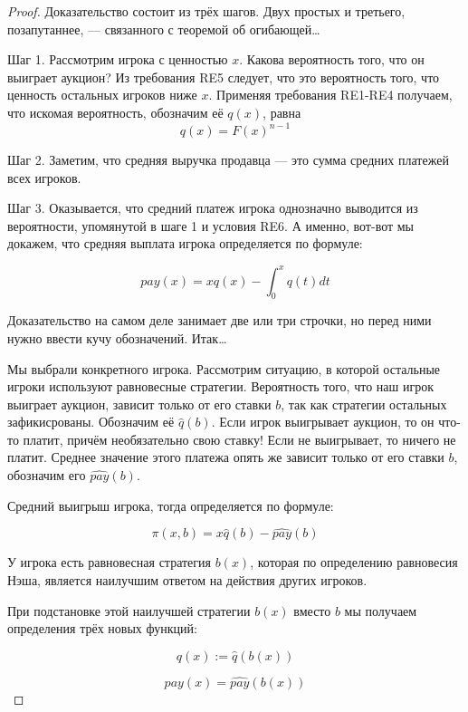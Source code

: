 \begin{proof}

Доказательство состоит из трёх шагов. Двух простых и третьего, позапутаннее, — связанного с теоремой об огибающей\ldots

Шаг 1. Рассмотрим игрока с ценностью $ x $. Какова вероятность того, что он выиграет аукцион? Из требования RE5 следует, что это вероятность того, что ценность остальных игроков ниже $ x $. Применяя требования RE1-RE4 получаем, что искомая вероятность, обозначим её $ q(x) $, равна
\[ q(x)=F(x)^{n-1} \]

Шаг 2. Заметим, что средняя выручка продавца — это сумма средних платежей всех игроков.


Шаг 3. Оказывается, что средний платеж игрока однозначно выводится из вероятности, упомянутой в шаге 1 и условия RE6. А именно, вот-вот мы докажем, что средняя выплата игрока определяется по формуле:

\begin{equation}
\label{pay_eq}
pay(x)=xq(x)-\int_{0}^{x}q(t)dt
\end{equation}

Доказательство на самом деле занимает две или три строчки, но перед ними нужно ввести кучу обозначений. Итак\ldots

Мы выбрали конкретного игрока. Рассмотрим ситуацию, в которой остальные игроки используют равновесные стратегии. Вероятность того, что наш игрок выиграет аукцион, зависит только от его ставки $ b $, так как стратегии остальных зафикисрованы. Обозначим её $ \widehat{q}(b) $. Если игрок выигрывает аукцион, то он что-то платит, причём необязательно свою ставку! Если не выигрывает, то ничего не платит. Среднее значение этого платежа опять же зависит только от его ставки $ b $, обозначим его $ \widehat{pay}(b) $.

Средний выигрыш игрока, тогда определяется по формуле:

\begin{equation}
\pi(x,b)=x\widehat{q}(b)-\widehat{pay}(b)
\end{equation}

У игрока есть равновесная стратегия $ b(x) $, которая по определению равновесия Нэша, является наилучшим ответом на действия других игроков.

При подстановке этой наилучшей стратегии  $ b(x) $ вместо $ b $ мы получаем определения трёх новых функций:

\[ q(x):=\widehat{q}(b(x)) \]

\[ pay(x)=\widehat{pay}(b(x)) \]


\end{proof}
